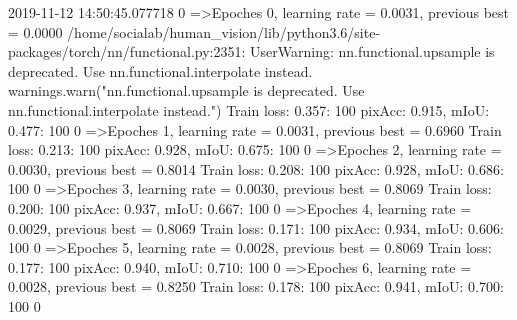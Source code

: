 2019-11-12 14:50:45.077718
  0%
=>Epoches 0, learning rate = 0.0031,                 previous best = 0.0000
/home/socialab/human_vision/lib/python3.6/site-packages/torch/nn/functional.py:2351: UserWarning: nn.functional.upsample is deprecated. Use nn.functional.interpolate instead.
  warnings.warn("nn.functional.upsample is deprecated. Use nn.functional.interpolate instead.")
Train loss: 0.357: 100%
pixAcc: 0.915, mIoU: 0.477: 100%
  0%
=>Epoches 1, learning rate = 0.0031,                 previous best = 0.6960
Train loss: 0.213: 100%
pixAcc: 0.928, mIoU: 0.675: 100%
  0%
=>Epoches 2, learning rate = 0.0030,                 previous best = 0.8014
Train loss: 0.208: 100%
pixAcc: 0.928, mIoU: 0.686: 100%
  0%
=>Epoches 3, learning rate = 0.0030,                 previous best = 0.8069
Train loss: 0.200: 100%
pixAcc: 0.937, mIoU: 0.667: 100%
  0%
=>Epoches 4, learning rate = 0.0029,                 previous best = 0.8069
Train loss: 0.171: 100%
pixAcc: 0.934, mIoU: 0.606: 100%
  0%
=>Epoches 5, learning rate = 0.0028,                 previous best = 0.8069
Train loss: 0.177: 100%
pixAcc: 0.940, mIoU: 0.710: 100%
  0%
=>Epoches 6, learning rate = 0.0028,                 previous best = 0.8250
Train loss: 0.178: 100%
pixAcc: 0.941, mIoU: 0.700: 100%
  0%
